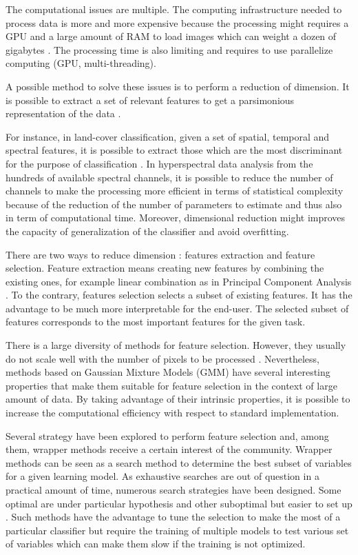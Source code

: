 \documentclass[journal,peerreview,onecolumn]{IEEEtran}
\begin{document}
The computational issues are multiple. The computing infrastructure needed to process data is more and more expensive because the processing might requires a GPU and a large amount of RAM to load images which can weight a dozen of gigabytes \cite{christophe2011remote}\cite{plaza2011high}. The processing time is also limiting and requires to use parallelize computing (GPU, multi-threading).

A possible method to solve these issues is to perform a reduction of dimension. It is possible to extract a set of relevant features to get a parsimonious representation of the data \cite{jimenez1998supervised}.

For instance, in land-cover classification, given a set of spatial, temporal and spectral features, it is possible to extract those which are the most discriminant for the purpose of classification \cite{fassnacht2014comparison}. In hyperspectral data analysis from the hundreds of available spectral channels, it is possible to reduce the number of channels to make the processing more efficient in terms of statistical complexity because of the reduction of the number of parameters to estimate and thus also in term of computational time. Moreover, dimensional reduction might improves the capacity of generalization of the classifier and avoid overfitting.

There are two ways to reduce dimension \cite{Guyon:2006:FEF:1208773}: features extraction and feature selection. Feature extraction means creating new features by combining the existing ones, for example linear combination as in Principal Component Analysis \cite{jimenez1998supervised}. To the contrary, features selection selects a subset of existing features. It has the advantage to be much more interpretable for the end-user. The selected subset of features corresponds to the most important features for the given task.

There is a large diversity of methods for feature selection. However, they usually do not scale well with the number of pixels to be processed \cite{fauvel2015fast}. Nevertheless, methods based on Gaussian Mixture Models (GMM) have several interesting properties that make them suitable for feature selection in the context of large amount of data. By taking advantage of their intrinsic properties, it is possible to increase the computational efficiency with respect to standard implementation.

Several strategy have been explored to perform feature selection and, among them, wrapper methods receive a certain interest of the community. Wrapper methods can be seen as a search method to determine the best subset of variables for a given learning model. As exhaustive searches are out of question in a practical amount of time, numerous search strategies have been designed. Some optimal are under particular hypothesis \cite{narendra1977branch} and other suboptimal but easier to set up \cite{whitney1971direct}\cite{somol1999adaptive}. Such methods have the advantage to tune the selection to make the most of a particular classifier but require the training of multiple models to test various set of variables which can make them slow if the training is not optimized.
\end{document}
